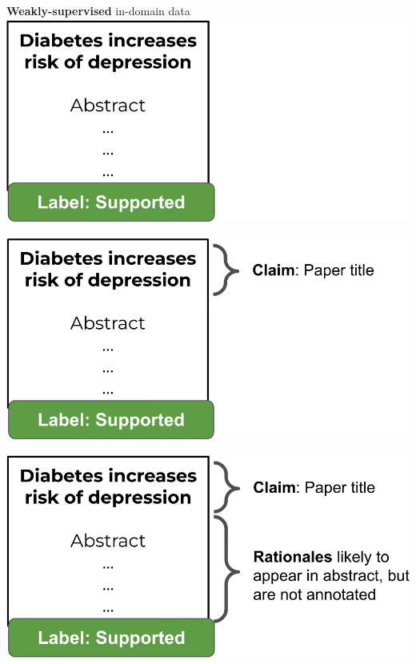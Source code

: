 \documentclass[13.5pt,aspecratio=169, xcolor=dvipsnames]{beamer}
\begin{document}
\begin{frame}
\begin{minipage}[t]{0.54\textwidth}
{{            }

             {
                \centering
                \textbf{Weakly-supervised} in-domain data
                \phantom{                fdjjnf
                }
            }
             {
                \includegraphics[width=\textwidth]{Stage_1_data_0.png}
            }

             {
                \includegraphics[width=\textwidth]{Stage_1_data_1.png}
            }

             {
                \includegraphics[width=\textwidth]{Stage_1_data_2.png}
            }

}
\end{minipage}
\end{frame}
\end{document}

